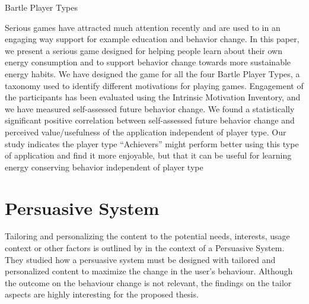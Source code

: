 Bartle Player Types

Serious games have attracted much attention recently and are used to in an engaging way support for example education and behavior change. In this paper, we present a serious game designed for helping people learn about their own energy consumption and to support behavior change towards more sustainable energy habits. We have designed the game for all the four Bartle Player Types, a taxonomy used to identify different motivations for playing games. Engagement of the participants has been evaluated using the Intrinsic Motivation Inventory, and we have measured self-assessed future behavior change. We found a statistically significant positive correlation between self-assessed future behavior change and perceived value/usefulness of the application independent of player type. Our study indicates the player type “Achievers” might perform better using this type of application and find it more enjoyable, but that it can be useful for learning energy conserving behavior independent of player type


\section{Persuasive System}
Tailoring and personalizing the content to the potential needs, interests, usage context or other factors is outlined by \cite{oinas2009persuasive} in the context of a Persuasive System. They studied how a persuasive system must be designed with tailored and personalized content to maximize the change in the user's behaviour. Although the outcome on the behaviour change is not relevant, the findings on the tailor aspects are highly interesting for the proposed thesis.




